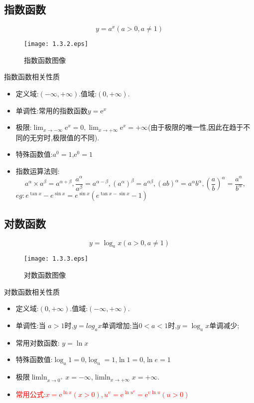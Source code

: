 \documentclass[12pt, a4paper, oneside, UTF8]{ctexbook}  %
\begin{document}
\subsection{指数函数}
$$
    y=a^x (a>0,a \neq 1)
$$
\begin{figure}[H]
    \centering \texttt{[image: 1.3.2.eps]} \caption{指数函数图像}
\end{figure}

\begin{criterion}{指数函数相关性质}{}
    \begin{itemize}
        \item 定义域:$(-\infty,+\infty)$.值域:$(0,+\infty)$.
        \item 单调性:常用的指数函数$y=\mathrm{e}^x$
        \item 极限:$\lim_{x\to-\infty}\mathrm{e}^x=0,\lim_{x\to+\infty}\mathrm{e}^x=+\infty$(由于极限的唯一性,因此在趋于不同的无穷时,极限值的不同).
        \item 特殊函数值:$a^0=1$,$\mathrm{e}^0=1$
        \item 指数运算法则:
              $$
                  a^{\alpha}\times a^{\beta}=a^{\alpha+\beta},\frac{a^{\alpha}}{a^{\beta}}=a^{\alpha-\beta},(a^{\alpha})^{\beta}=a^{\alpha\beta},(ab)^{\alpha}=a^{\alpha}b^{\alpha},\left(\frac{a}{b}\right)^{\alpha}=\frac{a^{\alpha}}{b^{\alpha}},
              $$
              $eg:e^{\tan x}-e^{\sin x}=e^{\sin x}\left(e^{\tan x-\sin x}-1\right)$
    \end{itemize}
\end{criterion}

\subsection{对数函数}
$$
    y=\log_a x (a>0,a \neq 1)
$$

\begin{figure}[H]
    \centering \texttt{[image: 1.3.3.eps]} \caption{对数函数图像}
\end{figure}
\begin{criterion}{对数函数相关性质}{}
    \begin{itemize}
        \item 定义域:$(0,+\infty)$.值域:$(-\infty,+\infty)$.
        \item 单调性:当 $a>1$时,$y=log_a x$单调增加;当$0<a<1$时,$y=\log_a x$单调减少;
        \item 常用对数函数: $y=\ln x$
        \item 特殊函数值:$\log_a 1=0$,$\log_a=1$,$\ln 1=0$,$\ln e=1$
        \item 极限$\operatorname*{lim ln}_{x\to0^{+}}x=-\infty$,$\operatorname*{lim ln}_{x\to+\infty}x=+\infty$.
        \item \textcolor{red}{常用公式:$x=\mathrm{e}^{\ln x}\left(x>0\right),u^{\upsilon}=\mathrm{e}^{\ln u^v}=\mathrm{e}^{\upsilon\ln u}\left(u>0\right)$}
    \end{itemize}
\end{criterion}
\end{document}
